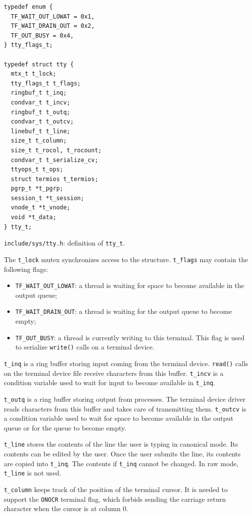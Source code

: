 \documentclass[shortabstract, manyadvisors, english, mgr]{iithesis}
\begin{document}
\begin{listing}[H]
\begin{verbatim}
typedef enum {
  TF_WAIT_OUT_LOWAT = 0x1,
  TF_WAIT_DRAIN_OUT = 0x2,
  TF_OUT_BUSY = 0x4,
} tty_flags_t;

typedef struct tty {
  mtx_t t_lock;
  tty_flags_t t_flags;
  ringbuf_t t_inq;
  condvar_t t_incv;
  ringbuf_t t_outq;
  condvar_t t_outcv;
  linebuf_t t_line;
  size_t t_column;
  size_t t_rocol, t_rocount;
  condvar_t t_serialize_cv;
  ttyops_t t_ops;
  struct termios t_termios;
  pgrp_t *t_pgrp;
  session_t *t_session;
  vnode_t *t_vnode;
  void *t_data;
} tty_t;
\end{verbatim}
\caption{\texttt{include/sys/tty.h}: definition of \texttt{tty\_t}.}
\end{listing}
The \texttt{t\_lock} mutex synchronizes access to the structure.
\texttt{t\_flags} may contain the following flags:
\begin{itemize}
\item \texttt{TF\_WAIT\_OUT\_LOWAT}: a thread is waiting for space to become
  available in the output queue;
\item \texttt{TF\_WAIT\_DRAIN\_OUT}: a thread is waiting for the output queue to
  become empty;
\item \texttt{TF\_OUT\_BUSY}: a thread is currently writing to this terminal.
  This flag is used to serialize \texttt{write()} calls on a terminal device.
\end{itemize}

\texttt{t\_inq} is a ring buffer storing input coming from the terminal device.
\texttt{read()} calls on the terminal device file receive characters from this
buffer. \texttt{t\_incv} is a condition variable used to wait for input to
become available in \texttt{t\_inq}.

\texttt{t\_outq} is a ring buffer storing output from processes. The terminal
device driver reads characters from this buffer and takes care of transmitting
them. \texttt{t\_outcv} is a condition variable used to wait for space to become
available in the output queue or for the queue to become empty.

\texttt{t\_line} stores the contents of the line the user is typing in canonical
mode. Its contents can be edited by the user. Once the user submits the line,
its contents are copied into \texttt{t\_inq}. The contents if \texttt{t\_inq}
cannot be changed. In raw mode, \texttt{t\_line} is not used.

\texttt{t\_column} keeps track of the position of the terminal cursor. It is
needed to support the \texttt{ONOCR} terminal flag, which forbids sending the
carriage return character when the cursor is at column 0.
\end{document}
